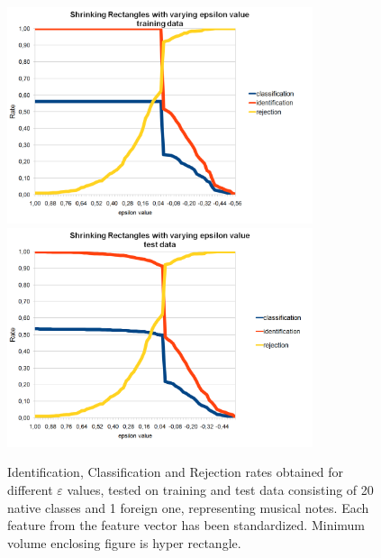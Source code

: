 \begin{figure}[htp]
	\centering
	\includegraphics[width=0.80\textwidth]{Figures/charts/MUSIC_NOTES_STANDARIZED/DIGITS_ShrinkingRectanglesToleranceTraining.png}
	\hspace{12pt}
	\includegraphics[width=0.80\textwidth]{Figures/charts/MUSIC_NOTES_STANDARIZED/DIGITS_ShrinkingRectanglesToleranceTest.png}
	\caption{ Identification, Classification and Rejection rates obtained for different $\varepsilon$ values, tested on training and test data consisting of 20 native classes and 1 foreign one, representing musical notes. Each feature from the feature vector has been standardized. Minimum volume enclosing figure is hyper rectangle. }
\end{figure}

